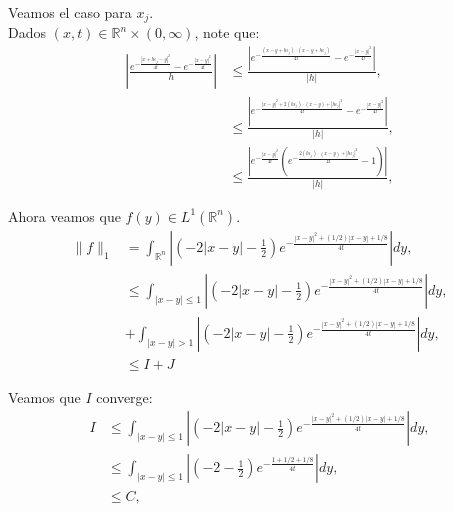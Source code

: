 \documentclass{beamer}
\begin{document}
\begin{frame}
  \begin{block}{}
    Veamos el caso para $x_j$.\\
    Dados $(x,t)\in\mathbb{R}^{n}\times (0,\infty)$, note que:
    \begin{align*}
      \left| \frac{e^{-\frac{|x+h\epsilon_j-y|^2}{4t}}-e^{-\frac{|x-y|^2}{4t}}}{h} \right|&\leq\frac{\left| e^{-\frac{(x-y+h\epsilon_j)\cdot(x-y+h\epsilon_j)}{4t}}-e^{-\frac{|x-y|^2}{4t}} \right|}{|h|},\\
      &\leq\frac{\left| e^{-\frac{|x-y|^2+2(h\epsilon_j)\cdot(x-y)+|h\epsilon_j|^2}{4t}}-e^{-\frac{|x-y|^2}{4t}} \right|}{|h|},\\
      &\leq \frac{\left| e^{-\frac{|x-y|^2}{4t}}\left( e^{-\frac{2(h\epsilon_j)\cdot(x-y)+|h\epsilon_j|^2}{4t}}-1 \right) \right|}{|h|},
    \end{align*}
  \end{block}
\end{frame}

\begin{frame}
  \begin{block}{}
        Ahora veamos que $f(y)\in L^1(\mathbb{R}^{n})$.\\
        \begin{align*}
          \|f\|_1&=\int_{\mathbb{R}^{n}} \left| \left(-2|x-y| -\frac{1}{2}\right)e^{-\frac{|x-y|^2+(1/2)|x-y|+1/8}{4t}}\right|dy,\\
          &\leq \int_{|x-y|\leq 1} \left| \left(-2|x-y| -\frac{1}{2}\right)e^{-\frac{|x-y|^2+(1/2)|x-y|+1/8}{4t}}\right|dy,\\
          &+ \int_{|x-y|>1} \left| \left(-2|x-y| -\frac{1}{2}\right)e^{-\frac{|x-y|^2+(1/2)|x-y|+1/8}{4t}}\right|dy,\\
          &\leq I + J
        \end{align*}
  \end{block}
\end{frame}

\begin{frame}
  \begin{block}{}
    Veamos que $I$ converge:
    \begin{align*}
      I&\leq \int_{|x-y|\leq 1} \left| \left(-2|x-y| -\frac{1}{2}\right)e^{-\frac{|x-y|^2+(1/2)|x-y|+1/8}{4t}}\right|dy,\\
      &\leq \int_{|x-y|\leq 1} \left| \left(-2 -\frac{1}{2}\right)e^{-\frac{1+1/2+1/8}{4t}}\right|dy,\\
      &\leq C,
    \end{align*}
  \end{block}
\end{frame}
\end{document}

